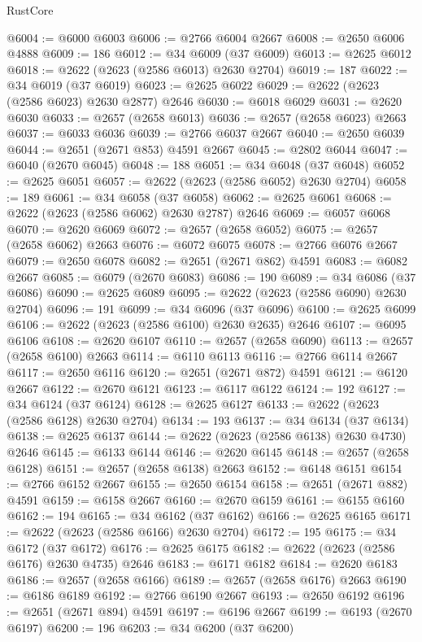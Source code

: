 \begin{lexlean}{RustCore}
\begin{coremodule}
@6004 := @6000 @6003
@6006 := @2766 @6004 @2667
@6008 := @2650 @6006 @4888
@6009 := 186
@6012 := @34 @6009 (@37 @6009)
@6013 := @2625 @6012
@6018 := @2622 (@2623 (@2586 @6013) @2630 @2704)
@6019 := 187
@6022 := @34 @6019 (@37 @6019)
@6023 := @2625 @6022
@6029 := @2622 (@2623 (@2586 @6023) @2630 @2877) @2646
@6030 := @6018 @6029
@6031 := @2620 @6030
@6033 := @2657 (@2658 @6013)
@6036 := @2657 (@2658 @6023) @2663
@6037 := @6033 @6036
@6039 := @2766 @6037 @2667
@6040 := @2650 @6039
@6044 := @2651 (@2671 @853) @4591 @2667
@6045 := @2802 @6044
@6047 := @6040 (@2670 @6045)
@6048 := 188
@6051 := @34 @6048 (@37 @6048)
@6052 := @2625 @6051
@6057 := @2622 (@2623 (@2586 @6052) @2630 @2704)
@6058 := 189
@6061 := @34 @6058 (@37 @6058)
@6062 := @2625 @6061
@6068 := @2622 (@2623 (@2586 @6062) @2630 @2787) @2646
@6069 := @6057 @6068
@6070 := @2620 @6069
@6072 := @2657 (@2658 @6052)
@6075 := @2657 (@2658 @6062) @2663
@6076 := @6072 @6075
@6078 := @2766 @6076 @2667
@6079 := @2650 @6078
@6082 := @2651 (@2671 @862) @4591
@6083 := @6082 @2667
@6085 := @6079 (@2670 @6083)
@6086 := 190
@6089 := @34 @6086 (@37 @6086)
@6090 := @2625 @6089
@6095 := @2622 (@2623 (@2586 @6090) @2630 @2704)
@6096 := 191
@6099 := @34 @6096 (@37 @6096)
@6100 := @2625 @6099
@6106 := @2622 (@2623 (@2586 @6100) @2630 @2635) @2646
@6107 := @6095 @6106
@6108 := @2620 @6107
@6110 := @2657 (@2658 @6090)
@6113 := @2657 (@2658 @6100) @2663
@6114 := @6110 @6113
@6116 := @2766 @6114 @2667
@6117 := @2650 @6116
@6120 := @2651 (@2671 @872) @4591
@6121 := @6120 @2667
@6122 := @2670 @6121
@6123 := @6117 @6122
@6124 := 192
@6127 := @34 @6124 (@37 @6124)
@6128 := @2625 @6127
@6133 := @2622 (@2623 (@2586 @6128) @2630 @2704)
@6134 := 193
@6137 := @34 @6134 (@37 @6134)
@6138 := @2625 @6137
@6144 := @2622 (@2623 (@2586 @6138) @2630 @4730) @2646
@6145 := @6133 @6144
@6146 := @2620 @6145
@6148 := @2657 (@2658 @6128)
@6151 := @2657 (@2658 @6138) @2663
@6152 := @6148 @6151
@6154 := @2766 @6152 @2667
@6155 := @2650 @6154
@6158 := @2651 (@2671 @882) @4591
@6159 := @6158 @2667
@6160 := @2670 @6159
@6161 := @6155 @6160
@6162 := 194
@6165 := @34 @6162 (@37 @6162)
@6166 := @2625 @6165
@6171 := @2622 (@2623 (@2586 @6166) @2630 @2704)
@6172 := 195
@6175 := @34 @6172 (@37 @6172)
@6176 := @2625 @6175
@6182 := @2622 (@2623 (@2586 @6176) @2630 @4735) @2646
@6183 := @6171 @6182
@6184 := @2620 @6183
@6186 := @2657 (@2658 @6166)
@6189 := @2657 (@2658 @6176) @2663
@6190 := @6186 @6189
@6192 := @2766 @6190 @2667
@6193 := @2650 @6192
@6196 := @2651 (@2671 @894) @4591
@6197 := @6196 @2667
@6199 := @6193 (@2670 @6197)
@6200 := 196
@6203 := @34 @6200 (@37 @6200)

\end{coremodule}
\end{lexlean}
